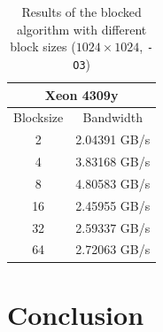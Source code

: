 \documentclass{article}
\begin{document}
\begin{table}
\begin{tabular}{|c|c|}
        \hline
        \multicolumn{2}{|c|}{\textbf{Xeon 4309y}} \\
        \hline
        Blocksize & Bandwidth \\ \hline
        2         & 2.04391 GB/s \\ \hline
        4         & 3.83168 GB/s \\ \hline
        \rowcolor{LightYellow}
        8         & 4.80583 GB/s \\ \hline
        16        & 2.45955 GB/s \\ \hline
        32        & 2.59337 GB/s \\ \hline
        64        & 2.72063 GB/s \\ \hline
    \end{tabular}
    \caption{Results of the blocked algorithm with different block sizes ($1024 \times 1024$, \texttt{-O3})}
    \label{tab:blocked_results}
\end{table}
\section{Conclusion}
\end{document}
